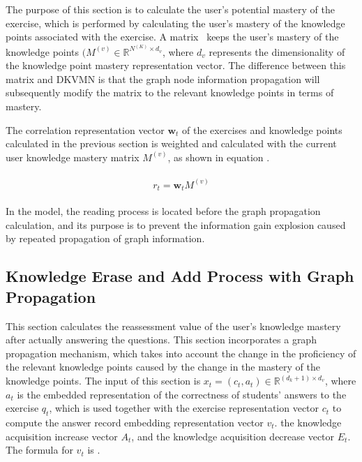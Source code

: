 The purpose of this section is to calculate the user's potential mastery of the exercise, which is performed by calculating the user's mastery of the knowledge points associated with the exercise. A matrix \ keeps the user's mastery of the knowledge points \((M^{(v)}\in\mathbb{R}^{N^{(K)}\times d_v}\), where \(d_v\) represents the dimensionality of the knowledge point mastery representation vector. The difference between this matrix and DKVMN is that the graph node information propagation will subsequently modify the matrix to the relevant knowledge points in terms of mastery.

The correlation representation vector \(\mathbf{w}_t\) of the exercises and knowledge points calculated in the previous section is weighted and calculated with the current user knowledge mastery matrix \(M^{(v)}\), as shown in equation \eqname{\ref{fml:ch3-read}}.

\begin{align}\label{fml:ch3-read}
    \begin{split}
        r_t=\mathbf{w}_t M^{(v)}
    \end{split}
\end{align}


In the model, the reading process is located before the graph propagation calculation, and its purpose is to prevent the information gain explosion caused by repeated propagation of graph information.

\subsection{Knowledge Erase and Add Process with Graph Propagation}
This section calculates the reassessment value of the user's knowledge mastery after actually answering the questions. This section incorporates a graph propagation mechanism, which takes into account the change in the proficiency of the relevant knowledge points caused by the change in the mastery of the knowledge points. The input of this section is \(x_t=(c_t,a_t)\in\mathbb{R}^{(d_k+1)\times d_v} \), where \(a_t\) is the embedded representation of the correctness of students' answers to the exercise \(q_t\), which is used together with the exercise representation vector \(c_t\) to compute the answer record embedding representation vector \(v_t\). the knowledge acquisition increase vector \(A_t\), and the knowledge acquisition decrease vector \(E_t\). The formula for \(v_t\) is \eqname{\ref{fml:ch3-write-vt}}.

